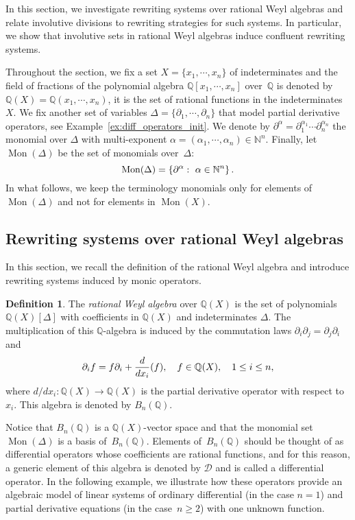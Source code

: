 \documentclass[11pt]{article}
\theoremstyle{definition}
\newtheorem{definition}[theorem]{Definition}
\newcommand\diff[1]{\partial_{#1}}
\newcommand\D{\mathcal{D}}
\newcommand\Q{\mathbb{Q}}
\newcommand\N{\mathbb{N}}
\newcommand\QX{\mathbb{Q}[x_1,\cdots,x_n]}
\newcommand\QXX{\mathbb{Q}(x_1,\cdots,x_n)}
\newcommand\Weyl[1]{B_{#1}(\Q)}
\newcommand\monBasis{\Mon(\Delta)}
\DeclareMathOperator{\Mon}{Mon}
\begin{document}
In this section, we investigate rewriting systems over rational Weyl
algebras and relate involutive divisions to rewriting strategies for such
systems. In particular, we show that involutive sets in rational Weyl
algebras induce confluent rewriting systems.
\medskip

Throughout the section, we fix a set $X=\{x_1,\cdots,x_n\}$ of
indeterminates and the field of fractions of the polynomial algebra $\QX$
over~$\Q$ is denoted by $\Q(X)=\QXX$, it is the set of rational
functions in the indeterminates $X$. We fix another set of
variables $\Delta=\{\diff{1},\cdots,\diff{n}\}$ that model partial
derivative operators, see Example~\ref{ex:diff_operators_init}. We denote
by $\partial^{\alpha}=\diff{1}^{\alpha_1}\cdots\diff{n}^{\alpha_n}$ the
monomial over $\Delta$ with multi-exponent
$\alpha=(\alpha_1,\cdots,\alpha_n)\in\N^n$. Finally, let $\monBasis$ be
the set of monomials over~$\Delta$:
\[\monBasis=\left\{\partial^\alpha:\ \alpha\in\N^n\right\}.
\smallskip\]
In what follows, we keep the terminology monomials only for elements of
$\Mon(\Delta)$ and not for elements in $\Mon(X)$.

\subsection{Rewriting systems over rational Weyl algebras}
\label{sec:rewriting_systems_over_Weyl_algebras}

In this section, we recall the definition of the rational Weyl algebra
and introduce rewriting systems induced by monic operators.
\medskip

\begin{definition}
  The {\it rational Weyl algebra} over $\Q(X)$ is the set of polynomials
  $\Q(X)[\Delta]$ with coefficients in $\Q(X)$ and indeterminates
  $\Delta$. The multiplication of this $\mathbb Q$-algebra is induced by
  the commutation laws $\partial_i\partial_j=\partial_j\partial_i$ and
  \[\diff{i}f=f\diff{i}+\frac{d}{dx_i}(f),\quad f\in\Q(X),\quad
  1\leq i\leq n,
  \smallskip\]
  where $d/dx_i:\Q(X)\to\Q(X)$ is the partial derivative operator with
  respect to~$x_i$. This algebra is denoted by $\Weyl{n}$.
\end{definition}
\smallskip

Notice that $\Weyl{n}$ is a $\Q(X)$-vector space and that the monomial 
set $\monBasis$ is a basis of~$\Weyl{n}$. Elements of~$\Weyl{n}$ should 
be thought of as differential operators whose coefficients are rational
functions, and for this reason, a generic element of this algebra is
denoted by $\D$ and is called a differential operator. In the following
example, we illustrate how these operators provide an algebraic model of
linear systems of ordinary differential (in the case $n=1$) and partial
derivative equations (in the case~$n\geq 2$) with one unknown function. 
\smallskip
\end{document}
